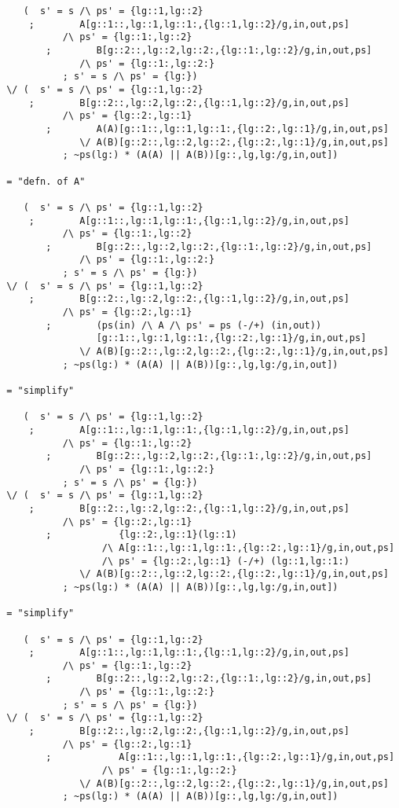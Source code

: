 \begin{verbatim}
    (  s' = s /\ ps' = {lg::1,lg::2}
     ;        A[g::1::,lg::1,lg::1:,{lg::1,lg::2}/g,in,out,ps]
           /\ ps' = {lg::1:,lg::2}
        ;        B[g::2::,lg::2,lg::2:,{lg::1:,lg::2}/g,in,out,ps]
              /\ ps' = {lg::1:,lg::2:}
           ; s' = s /\ ps' = {lg:})
 \/ (  s' = s /\ ps' = {lg::1,lg::2}
     ;        B[g::2::,lg::2,lg::2:,{lg::1,lg::2}/g,in,out,ps]
           /\ ps' = {lg::2:,lg::1}
        ;        A(A)[g::1::,lg::1,lg::1:,{lg::2:,lg::1}/g,in,out,ps]
              \/ A(B)[g::2::,lg::2,lg::2:,{lg::2:,lg::1}/g,in,out,ps]
           ; ~ps(lg:) * (A(A) || A(B))[g::,lg,lg:/g,in,out])

 = "defn. of A"

    (  s' = s /\ ps' = {lg::1,lg::2}
     ;        A[g::1::,lg::1,lg::1:,{lg::1,lg::2}/g,in,out,ps]
           /\ ps' = {lg::1:,lg::2}
        ;        B[g::2::,lg::2,lg::2:,{lg::1:,lg::2}/g,in,out,ps]
              /\ ps' = {lg::1:,lg::2:}
           ; s' = s /\ ps' = {lg:})
 \/ (  s' = s /\ ps' = {lg::1,lg::2}
     ;        B[g::2::,lg::2,lg::2:,{lg::1,lg::2}/g,in,out,ps]
           /\ ps' = {lg::2:,lg::1}
        ;        (ps(in) /\ A /\ ps' = ps (-/+) (in,out))
                 [g::1::,lg::1,lg::1:,{lg::2:,lg::1}/g,in,out,ps]
              \/ A(B)[g::2::,lg::2,lg::2:,{lg::2:,lg::1}/g,in,out,ps]
           ; ~ps(lg:) * (A(A) || A(B))[g::,lg,lg:/g,in,out])

 = "simplify"

    (  s' = s /\ ps' = {lg::1,lg::2}
     ;        A[g::1::,lg::1,lg::1:,{lg::1,lg::2}/g,in,out,ps]
           /\ ps' = {lg::1:,lg::2}
        ;        B[g::2::,lg::2,lg::2:,{lg::1:,lg::2}/g,in,out,ps]
              /\ ps' = {lg::1:,lg::2:}
           ; s' = s /\ ps' = {lg:})
 \/ (  s' = s /\ ps' = {lg::1,lg::2}
     ;        B[g::2::,lg::2,lg::2:,{lg::1,lg::2}/g,in,out,ps]
           /\ ps' = {lg::2:,lg::1}
        ;            {lg::2:,lg::1}(lg::1)
                  /\ A[g::1::,lg::1,lg::1:,{lg::2:,lg::1}/g,in,out,ps]
                  /\ ps' = {lg::2:,lg::1} (-/+) (lg::1,lg::1:)
              \/ A(B)[g::2::,lg::2,lg::2:,{lg::2:,lg::1}/g,in,out,ps]
           ; ~ps(lg:) * (A(A) || A(B))[g::,lg,lg:/g,in,out])

 = "simplify"

    (  s' = s /\ ps' = {lg::1,lg::2}
     ;        A[g::1::,lg::1,lg::1:,{lg::1,lg::2}/g,in,out,ps]
           /\ ps' = {lg::1:,lg::2}
        ;        B[g::2::,lg::2,lg::2:,{lg::1:,lg::2}/g,in,out,ps]
              /\ ps' = {lg::1:,lg::2:}
           ; s' = s /\ ps' = {lg:})
 \/ (  s' = s /\ ps' = {lg::1,lg::2}
     ;        B[g::2::,lg::2,lg::2:,{lg::1,lg::2}/g,in,out,ps]
           /\ ps' = {lg::2:,lg::1}
        ;            A[g::1::,lg::1,lg::1:,{lg::2:,lg::1}/g,in,out,ps]
                  /\ ps' = {lg::1:,lg::2:}
              \/ A(B)[g::2::,lg::2,lg::2:,{lg::2:,lg::1}/g,in,out,ps]
           ; ~ps(lg:) * (A(A) || A(B))[g::,lg,lg:/g,in,out])


\end{verbatim}
